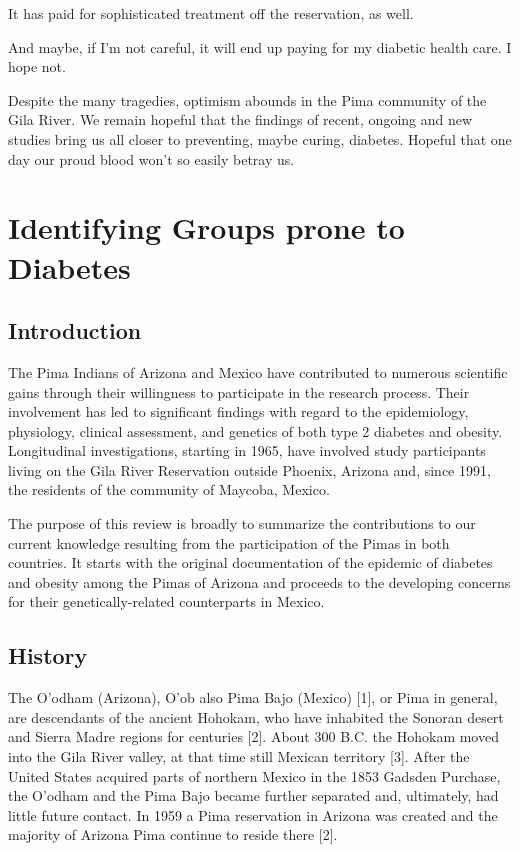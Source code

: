 \documentclass[12pt]{article}
\begin{document}
It has paid for sophisticated treatment off the reservation, as well.

And maybe, if I'm not careful, it will end up paying for my diabetic health care. I hope not.

Despite the many tragedies, optimism abounds in the Pima community of the Gila River. We remain hopeful that the findings of recent, ongoing and new studies bring us all closer to preventing, maybe curing, diabetes. Hopeful that one day our proud blood won't so easily betray us.

\newpage
\section{Identifying Groups prone to Diabetes}
\iffalse https://www.ncbi.nlm.nih.gov/pmc/articles/PMC4418458/ \fi
\subsection{Introduction}
The Pima Indians of Arizona and Mexico have contributed to numerous scientific gains through their willingness to participate in the research process. Their involvement has led to significant findings with regard to the epidemiology, physiology, clinical assessment, and genetics of both type 2 diabetes and obesity. Longitudinal investigations, starting in 1965, have involved study participants living on the Gila River Reservation outside Phoenix, Arizona and, since 1991, the residents of the community of Maycoba, Mexico.

The purpose of this review is broadly to summarize the contributions to our current knowledge resulting from the participation of the Pimas in both countries. It starts with the original documentation of the epidemic of diabetes and obesity among the Pimas of Arizona and proceeds to the developing concerns for their genetically-related counterparts in Mexico.

\subsection{History}
The O'odham (Arizona), O'ob also Pima Bajo (Mexico) [1], or Pima in general, are descendants of the ancient Hohokam, who have inhabited the Sonoran desert and Sierra Madre regions for centuries [2]. About 300 B.C. the Hohokam moved into the Gila River valley, at that time still Mexican territory [3]. After the United States acquired parts of northern Mexico in the 1853 Gadsden Purchase, the O'odham and the Pima Bajo became further separated and, ultimately, had little future contact. In 1959 a Pima reservation in Arizona was created and the majority of Arizona Pima continue to reside there [2].
\end{document}
